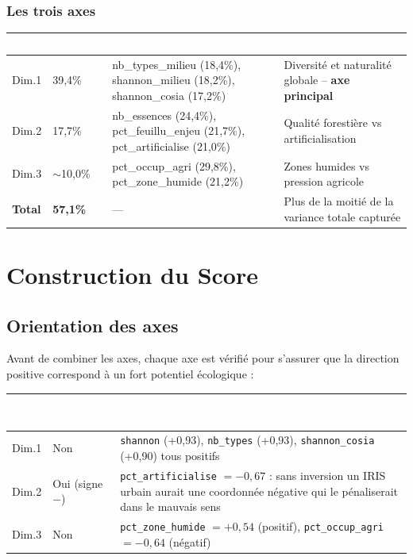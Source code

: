 \documentclass[11pt,a4paper]{report}
\begin{document}
\vspace{0.4cm}
\subsubsection*{Les trois axes}

\begin{tabularx}{\textwidth}{L{1.5cm} L{1.8cm} L{5cm} X}
  \toprule
  \textcolor{white}{\textbf{Axe}} &
  \textcolor{white}{\textbf{Variance}} &
  \textcolor{white}{\textbf{Variables dominantes}} &
  \textcolor{white}{\textbf{Interprétation}} \\
  \midrule
  Dim.1 & 39,4\% &
    nb\_types\_milieu (18,4\%), shannon\_milieu (18,2\%), shannon\_cosia (17,2\%) &
    Diversité et naturalité globale -- \textbf{axe principal} \\
  Dim.2 & 17,7\% &
    nb\_essences (24,4\%), pct\_feuillu\_enjeu (21,7\%), pct\_artificialise (21,0\%) &
    Qualité forestière vs artificialisation \\
  Dim.3 & $\sim$10,0\% &
    pct\_occup\_agri (29,8\%), pct\_zone\_humide (21,2\%) &
    Zones humides vs pression agricole \\
  \textbf{Total} & \textbf{57,1\%} & --- &
    Plus de la moitié de la variance totale capturée \\
  \bottomrule
\end{tabularx}

\section{Construction du Score}

\subsection{Orientation des axes}

Avant de combiner les axes, chaque axe est vérifié pour s'assurer que la direction positive correspond à un fort potentiel écologique :

\begin{tabularx}{\textwidth}{L{1.5cm} L{1.8cm} X}
  \toprule
  \textcolor{white}{\textbf{Axe}} &
  \textcolor{white}{\textbf{Inversion ?}} &
  \textcolor{white}{\textbf{Justification}} \\
  \midrule
  Dim.1 & Non &
    \texttt{shannon} (+0,93), \texttt{nb\_types} (+0,93), \texttt{shannon\_cosia} (+0,90) tous positifs \\
  Dim.2 & Oui (signe $-$) &
    \texttt{pct\_artificialise} $= -0{,}67$ : sans inversion un IRIS urbain aurait une coordonnée négative qui le pénaliserait dans le mauvais sens \\
  Dim.3 & Non &
    \texttt{pct\_zone\_humide} $= +0{,}54$ (positif), \texttt{pct\_occup\_agri} $= -0{,}64$ (négatif) \\
  \bottomrule
\end{tabularx}
\end{document}

